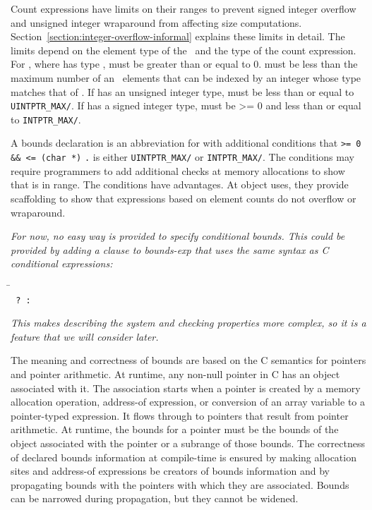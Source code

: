 Count expressions have limits on their ranges to prevent signed integer
overflow and unsigned integer wraparound from affecting size
computations. Section~\ref{section:integer-overflow-informal}
explains these limits in detail. The limits
depend on the element type of the \arrayptr\ and the type of the count
expression. For , where 
has type \arrayptrT ,
 must be greater than or equal to 0.  must be less
than the maximum number of an
\arrayptrT\ elements
that can be indexed by an integer whose type matches that of .
If  has an unsigned integer type,  must be less than
or equal to \texttt{UINTPTR\_MAX/}. If  has a
signed integer type,  must be \textgreater{}= 0 and less than
or equal to \texttt{INTPTR\_MAX/}.

A bounds declaration  is an
abbreviation for  with additional conditions that 
\texttt{>= 0 \&\&  <= (char *)}
\texttt{.}  is either
\texttt{UINTPTR\_MAX/} or
\texttt{INTPTR\_MAX/}. The conditions may
require programmers to add additional checks at memory allocations to
show that  is in range. The conditions have advantages. At
object uses, they provide scaffolding to show that expressions based on
element counts do not overflow or wraparound.

\emph{For now, no easy way is provided to specify conditional bounds.
This could be provided by adding a clause to bounds-exp that uses the
same syntax as C conditional expressions: }

\begin{tabbing}
\= \\
\>\texttt{ ?  : }
\end{tabbing}

\emph{This makes describing the system and checking properties more
complex, so it is a feature that we will consider later.}

The meaning and correctness of bounds are based on the C semantics for
pointers and pointer arithmetic. At runtime, any non-null pointer in C
has an object associated with it. The association starts when a pointer
is created by a memory allocation operation, address-of expression, or
conversion of an array variable to a pointer-typed expression. It flows
through to pointers that result from pointer arithmetic. At runtime, the
bounds for a pointer must be the bounds of the object associated with
the pointer or a subrange of those bounds. The correctness of declared
bounds information at compile-time is ensured by making allocation sites
and address-of expressions be creators of bounds information and by
propagating bounds with the pointers with which they are associated.
Bounds can be narrowed during propagation, but they cannot be widened.


